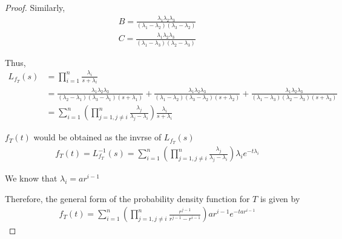 \documentclass[12pt]{article}
\begin{document}
\begin{proof}
    Similarly,
    \begin{align*}
        B = \frac{\lambda_1 \lambda_2 \lambda_3}{(\lambda_1 - \lambda_2)(\lambda_3 - \lambda_2)} \\
        C = \frac{\lambda_1 \lambda_2 \lambda_3}{(\lambda_1 - \lambda_3)(\lambda_2 - \lambda_3)}
    \end{align*}
    
    Thus,
    \begin{align*}
        L_{f_T}(s) &= \prod_{i=1}^{n} \frac{\lambda_i}{s + \lambda_i} \\
        &= \frac{\lambda_1 \lambda_2 \lambda_3}{(\lambda_2 - \lambda_1)(\lambda_3 - \lambda_1)(s + \lambda_1)} +  \frac{\lambda_1 \lambda_2 \lambda_3}{(\lambda_1 - \lambda_2)(\lambda_3 - \lambda_2)(s + \lambda_2)} +  \frac{\lambda_1 \lambda_2 \lambda_3}{(\lambda_1 - \lambda_3)(\lambda_2 - \lambda_3)(s + \lambda_3)} \\
        &= \sum_{i=1}^{n} \left( \prod_{j=1, j \ne i}^{n} \frac{\lambda_j}{\lambda_j - \lambda_i} \right) \frac{\lambda_i}{s + \lambda_i} 
    \end{align*}

    $f_T(t)$ would be obtained as the invrse of $L_{f_T}(s)$
    \begin{align*}
        f_T(t) = L_{f_T}^{-1}(s) = \sum_{i=1}^{n} \left( \prod_{j=1,j \ne i}^{n} \frac{\lambda_j}{\lambda_j - \lambda_i}\right) \lambda_i e^{-t\lambda_i}
    \end{align*}

    We know that $\lambda_i = ar^{i-1}$

    Therefore, the general form of the probability density function for $T$ is given by 
    \begin{align*}
        f_T(t) = \sum_{i=1}^{n} \left( \prod_{j=1,j \ne i}^{n} \frac{r^{j-1}}{r^{j-1} - r^{i-1}}\right) ar^{i-1} e^{-tar^{i-1}}
    \end{align*}
\end{proof}
\end{document}
